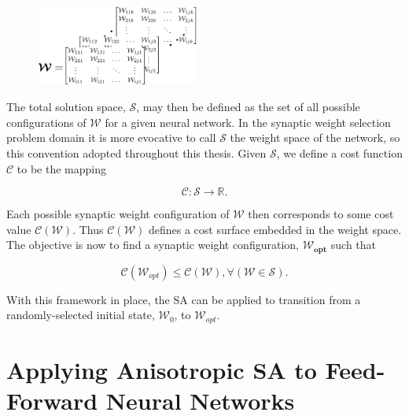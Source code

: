 \documentclass[11pt]{afthesis}
\begin{document}
	 \begin{figure}[ht!]
	 	\begin{center}
	 		\includegraphics[width = 2.1in]{figures/abstract_matrix_rep.eps}
	 		\label{fig:abstract_matrix_rep}
	 	\end{center}
	 \end{figure}
	 
	 The total solution space, $\boldsymbol{\mathcal{S}}$, may then be defined as the set of all possible configurations of $\boldsymbol{\mathcal{W}}$ for a given neural network. In the synaptic weight selection problem domain it is more evocative to call $\boldsymbol{\mathcal{S}}$ the weight space of the network, so this convention adopted throughout this thesis. Given $\boldsymbol{\mathcal{S}}$, we define a cost function $ \mathcal{C}$ to be the mapping
	 
	 \begin{equation*} \label{eq:cost_mapping}
	 \mathcal{C} : \boldsymbol{\mathcal{S}} \rightarrow \mathbb{R}.
	 \end{equation*}
	 
	 
	 Each possible synaptic weight configuration of $\boldsymbol{\mathcal{W}}$ then corresponds to some cost value $\mathcal{C}(\boldsymbol{\mathcal{W}})$. Thus $\mathcal{C}(\boldsymbol{\mathcal{W}})$ defines a cost surface embedded  in the weight space. The objective is now to find a synaptic weight configuration, $\boldsymbol{\mathcal{W}_{opt}}$ such that 
	 
	 \begin{equation*} \label{eq:optimal_definition}
	 \mathcal{C}(\boldsymbol{\mathcal{W}}_{opt}) \leq \mathcal{C}\left( \boldsymbol{\mathcal{W}}\right) , \forall\left(  \boldsymbol{\mathcal{W}} \in \boldsymbol{\mathcal{S}}\right) .
	 \end{equation*}
	 
	 \noindent With this framework in place, the SA can be applied to transition from a randomly-selected initial state, $\boldsymbol{\mathcal{W}}_0$, to $\boldsymbol{\mathcal{W}}_{opt}$.
	 

	\section{Applying Anisotropic SA to Feed-Forward Neural Networks}
	
\end{document}
